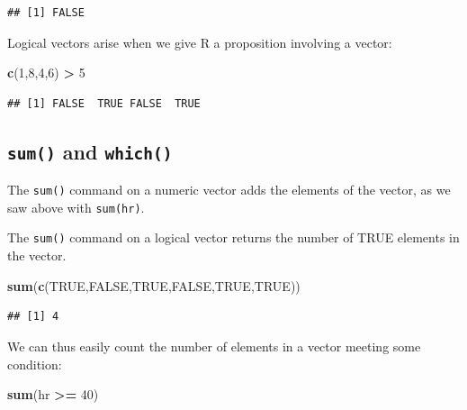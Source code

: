 \documentclass[
]{book}
\newenvironment{Shaded}{\begin{snugshade}}{\end{snugshade}}
\newcommand{\ConstantTok}[1]{\textcolor[rgb]{0.56,0.35,0.01}{#1}}
\newcommand{\DecValTok}[1]{\textcolor[rgb]{0.00,0.00,0.81}{#1}}
\newcommand{\FunctionTok}[1]{\textcolor[rgb]{0.13,0.29,0.53}{\textbf{#1}}}
\newcommand{\NormalTok}[1]{#1}
\newcommand{\SpecialCharTok}[1]{\textcolor[rgb]{0.81,0.36,0.00}{\textbf{#1}}}
\theoremstyle{definition}
\theoremstyle{definition}
\theoremstyle{definition}
\theoremstyle{definition}
\theoremstyle{remark}
\begin{document}
\begin{verbatim}
## [1] FALSE
\end{verbatim}

Logical vectors arise when we give R a proposition involving a vector:

\begin{Shaded}
\begin{Highlighting}[]
\FunctionTok{c}\NormalTok{(}\DecValTok{1}\NormalTok{,}\DecValTok{8}\NormalTok{,}\DecValTok{4}\NormalTok{,}\DecValTok{6}\NormalTok{) }\SpecialCharTok{\textgreater{}} \DecValTok{5}
\end{Highlighting}
\end{Shaded}

\begin{verbatim}
## [1] FALSE  TRUE FALSE  TRUE
\end{verbatim}

\subsection*{\texorpdfstring{\texttt{sum()} and \texttt{which()}}{sum() and which()}}\label{sum-and-which}

The \texttt{sum()} command on a numeric vector adds the elements of the vector, as we saw above with \texttt{sum(hr)}.

The \texttt{sum()} command on a logical vector returns the number of TRUE elements in the vector.

\begin{Shaded}
\begin{Highlighting}[]
\FunctionTok{sum}\NormalTok{(}\FunctionTok{c}\NormalTok{(}\ConstantTok{TRUE}\NormalTok{,}\ConstantTok{FALSE}\NormalTok{,}\ConstantTok{TRUE}\NormalTok{,}\ConstantTok{FALSE}\NormalTok{,}\ConstantTok{TRUE}\NormalTok{,}\ConstantTok{TRUE}\NormalTok{))}
\end{Highlighting}
\end{Shaded}

\begin{verbatim}
## [1] 4
\end{verbatim}

We can thus easily count the number of elements in a vector meeting some condition:

\begin{Shaded}
\begin{Highlighting}[]
\FunctionTok{sum}\NormalTok{(hr }\SpecialCharTok{\textgreater{}=} \DecValTok{40}\NormalTok{)}
\end{Highlighting}
\end{Shaded}
\end{document}
